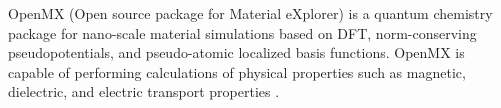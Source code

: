 OpenMX (Open source package for Material eXplorer) is a quantum chemistry package for nano-scale material simulations based on DFT, norm-conserving pseudopotentials, and pseudo-atomic localized basis functions. OpenMX is capable of performing calculations of physical properties such as magnetic, dielectric, and electric transport properties \cite{Parq_2014}. 